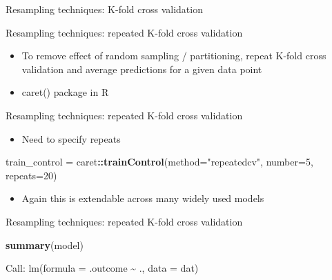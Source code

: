 \documentclass[ignorenonframetext,]{beamer}
\newenvironment{Shaded}{\begin{snugshade}}{\end{snugshade}}
\newcommand{\DataTypeTok}[1]{\textcolor[rgb]{0.13,0.29,0.53}{#1}}
\newcommand{\DecValTok}[1]{\textcolor[rgb]{0.00,0.00,0.81}{#1}}
\newcommand{\KeywordTok}[1]{\textcolor[rgb]{0.13,0.29,0.53}{\textbf{#1}}}
\newcommand{\NormalTok}[1]{#1}
\newcommand{\OperatorTok}[1]{\textcolor[rgb]{0.81,0.36,0.00}{\textbf{#1}}}
\newcommand{\StringTok}[1]{\textcolor[rgb]{0.31,0.60,0.02}{#1}}
\providecommand{\tightlist}{%
  \setlength{\itemsep}{0pt}\setlength{\parskip}{0pt}}
\begin{document}
\begin{frame}[fragile]
\begin{block}{Resampling techniques: K-fold cross validation}
\end{block}

\begin{block}{Resampling techniques: repeated K-fold cross validation}

\begin{itemize}
\item
  To remove effect of random sampling / partitioning, repeat K-fold
  cross validation and average predictions for a given data point
\item
  caret() package in R
\end{itemize}

\end{block}

\begin{block}{Resampling techniques: repeated K-fold cross validation}

\begin{itemize}
\tightlist
\item
  Need to specify repeats
\end{itemize}

\begin{Shaded}
\begin{Highlighting}[]
\NormalTok{train_control =}\StringTok{ }\NormalTok{caret}\OperatorTok{::}\KeywordTok{trainControl}\NormalTok{(}\DataTypeTok{method=}\StringTok{"repeatedcv"}\NormalTok{, }
                \DataTypeTok{number=}\DecValTok{5}\NormalTok{, }\DataTypeTok{repeats=}\DecValTok{20}\NormalTok{)}
\end{Highlighting}
\end{Shaded}

\begin{itemize}
\tightlist
\item
  Again this is extendable across many widely used models
\end{itemize}

\end{block}

\begin{block}{Resampling techniques: repeated K-fold cross validation}

\begin{Shaded}
\begin{Highlighting}[]
\KeywordTok{summary}\NormalTok{(model)}
\end{Highlighting}
\end{Shaded}

Call: lm(formula = .outcome \textasciitilde{} ., data = dat)


\end{block}
\end{frame}
\end{document}
